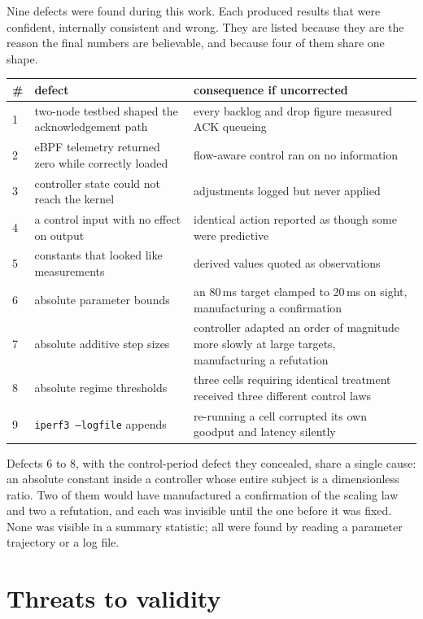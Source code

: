 \documentclass[11pt,a4paper]{article}
\begin{document}
Nine defects were found during this work. Each produced results that were
confident, internally consistent and wrong. They are listed because they are
the reason the final numbers are believable, and because four of them share
one shape.

\begin{center}\small
\begin{tabular}{p{0.6cm}p{6.1cm}p{8.6cm}}
\toprule
\# & defect & consequence if uncorrected \\ \midrule
1 & two-node testbed shaped the acknowledgement path & every backlog and drop
figure measured ACK queueing \\
2 & eBPF telemetry returned zero while correctly loaded & flow-aware control
ran on no information \\
3 & controller state could not reach the kernel & adjustments logged but never
applied \\
4 & a control input with no effect on output & identical action reported as
though some were predictive \\
5 & constants that looked like measurements & derived values quoted as
observations \\
6 & absolute parameter bounds & an 80\,ms target clamped to 20\,ms on sight,
manufacturing a confirmation \\
7 & absolute additive step sizes & controller adapted an order of magnitude
more slowly at large targets, manufacturing a refutation \\
8 & absolute regime thresholds & three cells requiring identical treatment
received three different control laws \\
9 & \texttt{iperf3 --logfile} appends & re-running a cell corrupted its own
goodput and latency silently \\
\bottomrule
\end{tabular}
\end{center}

Defects 6 to 8, with the control-period defect they concealed, share a single
cause: an absolute constant inside a controller whose entire subject is a
dimensionless ratio. Two of them would have manufactured a confirmation of the
scaling law and two a refutation, and each was invisible until the one before
it was fixed. None was visible in a summary statistic; all were found by
reading a parameter trajectory or a log file.

\section{Threats to validity}
\end{document}
